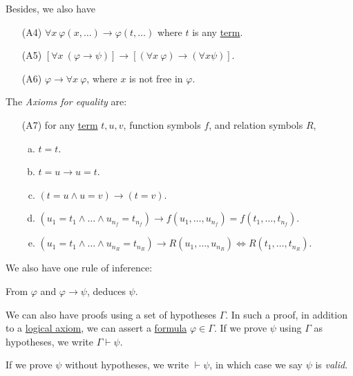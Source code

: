 \begin{definition}
\begin{definition}
		Besides, we also have
		\begin{enumerate}
			\item[(A4)] \(\forall x\ \varphi (x, \ldots ) \to \varphi (t, \ldots )\) where \(t\) is any \hyperref[def:term]{term}.
			\item[(A5)] \(\left[ \forall x\ (\varphi \to \psi ) \right] \to \left[ (\forall x\ \varphi ) \to (\forall x \psi ) \right] \).
			\item[(A6)] \(\varphi \to  \forall x\ \varphi \), where \(x\) is not free in \(\varphi \).
		\end{enumerate}
		\begin{definition}\label{def:axioms-for-equality}
			The \emph{Axioms for equality} are:
			\begin{enumerate}
				\item[(A7)] for any \hyperref[def:term]{term} \(t, u, v\), function symbols \(f\), and relation symbols \(R\),
					\begin{enumerate}[(a)]
						\item \(t = t\).
						\item \(t = u \to  u = t\).
						\item \((t=u \land u = v) \to  (t = v)\).
						\item \((u_1 = t_1 \land \ldots \land u_{n_f} = t_{n_f}) \to f(u_1, \ldots , u_{n_f}) = f(t_1, \ldots , t_{n_f})\).
						\item \((u_1 = t_1 \land \ldots \land u_{n_R} = t_{n_R}) \to R(u_1, \ldots , u_{n_R}) \iff R(t_1, \ldots , t_{n_R})\).
					\end{enumerate}
			\end{enumerate}
		\end{definition}
		We also have one rule of inference:
		\begin{definition}\label{def:Modus-Ponens}
			From \(\varphi \) and \(\varphi \to \psi\), deduces \(\psi \).
		\end{definition}
	\end{definition}

	We can also have proofs using a set of hypotheses \(\Gamma \). In such a proof, in addition to a \hyperref[def:logical-axiom]{logical axiom}, we can assert a \hyperref[def:formula]{formula} \(\varphi \in \Gamma \). If we prove \(\psi \) using \(\Gamma \) as hypotheses, we write \(\Gamma \vdash \psi \).

	\begin{definition}[Valid]\label{def:valid}
		If we prove \(\psi \) without hypotheses, we write \(\vdash \psi \), in which case we say \(\psi \) is \emph{valid}.
	\end{definition}
\end{definition}


